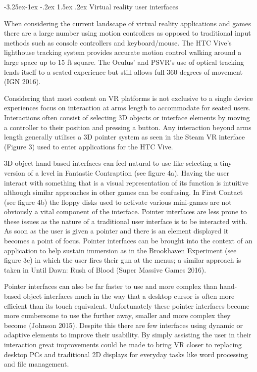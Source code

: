 \documentclass[12pt]{article}
\makeatletter
\renewcommand{\subsection}{\@startsection{subsection}{2}{\z@}%
             {-3.25ex\@plus -1ex \@minus -.2ex}%
             {1.5ex \@plus .2ex}%
             {\normalfont\large\scshape\bfseries}}
\makeatother
\begin{document}
\subsection{Virtual reality user interfaces}

When considering the current landscape of virtual reality applications and games there are a large number using motion controllers as opposed to traditional input methods such as console controllers and keyboard/mouse. The HTC Vive's lighthouse tracking system provides accurate motion control walking around a large space up to 15 ft square. The Oculus' and PSVR's use of optical tracking lends itself to a seated experience but still allows full 360 degrees of movement (IGN 2016). 

Considering that most content on VR platforms is not exclusive to a single device experiences focus on interaction at arms length to accommodate for seated users. Interactions often consist of selecting 3D objects or interface elements by moving a controller to their position and pressing a button. Any interaction beyond arms length generally utilises a 3D pointer system as seen in the Steam VR interface (Figure 3) used to enter applications for the HTC Vive.

3D object hand-based interfaces can feel natural to use like selecting a tiny version of a level in Fantastic Contraption (see figure 4a). Having the user interact with something that is a visual representation of its function is intuitive although similar approaches in other games can be confusing. In First Contact (see figure 4b) the floppy disks used to activate various mini-games are not obviously a vital component of the interface. Pointer interfaces are less prone to these issues as the nature of a traditional user interface is to be interacted with. As soon as the user is given a pointer and there is an element displayed it becomes a point of focus. Pointer interfaces can be brought into the context of an application to help sustain immersion as in the Brookhaven Experiment (see figure 3c) in which the user fires their gun at the menus; a similar approach is taken in Until Dawn: Rush of Blood (Super Massive Games 2016). 

Pointer interfaces can also be far faster to use and more complex than hand-based object interfaces much in the way that a desktop cursor is often more efficient than its touch equivalent. Unfortunately these pointer interfaces become more cumbersome to use the further away, smaller and more complex they become (Johnson 2015). Despite this there are few interfaces using dynamic or adaptive elements to improve their usability. By simply assisting the user in their interaction great improvements could be made to bring VR closer to replacing desktop PCs and traditional 2D displays for everyday tasks like word processing and file management.
\end{document}
